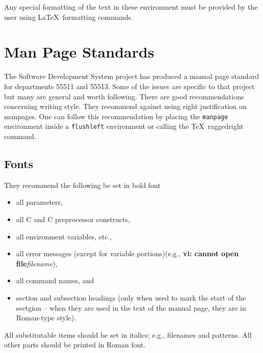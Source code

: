 Any special formatting of the text in these environment must be
provided by the user using \LaTeX\ formatting commands.

\section{Man Page Standards}\label{sec:std}
The Software Development System project has produced a manual page
standard for departments 55511 and 55513.\cite{bib:manpagestd}  Some
of the issues are specific to that project but many are general and
worth following.  There are good recommendations concerning writing
style.  They recommend against using right justification on manpages.
One can follow this recommendation by placing the {\tt manpage}
environment inside a {\tt flushleft} environment or calling the \TeX\
raggedright command.

\subsection{Fonts}
They recommend the following be set in bold font
  \begin{itemize}
    \item all parameters,
    \item all C and C preprocessor constructs,
    \item all environment variables, etc.,
    \item all error messages (except for variable portions)(e.g., {\bf
          vi: cannot open file}{\it filename}),
    \item all command names, and
    \item section and subsection headings (only when used to mark the
          start of the sectgion -- when they are used in the text of
          the manual page, they are in Roman-type style).
  \end{itemize}

All substitutable items should be set in italics; e.g., filenames and
patterns.  All other parts should be printed in Roman font.
